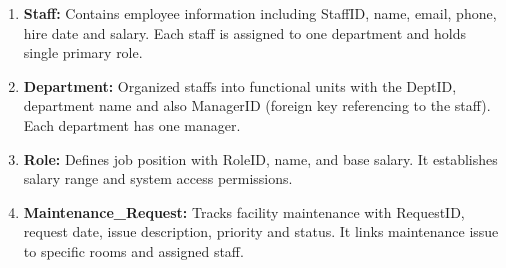 \documentclass[a4paper, 12pt]{article}
\begin{document}
\begin{enumerate}
        \item \textbf{Staff:}
                Contains employee information including StaffID, name, email, phone, hire date and salary. Each staff is assigned to one department and holds single primary role.
        \item \textbf{Department: }
                Organized staffs into functional units with the DeptID, department name and also ManagerID (foreign key referencing to the staff). Each department has one manager.
        \item \textbf{Role:}
                Defines job position with RoleID, name, and base salary. It establishes salary range and system access permissions.
        \item \textbf{Maintenance\_Request:}
                Tracks facility maintenance with RequestID, request date, issue description, priority and status. It links maintenance issue to specific rooms and assigned staff.
    \end{enumerate}

    \newpage
\end{document}
